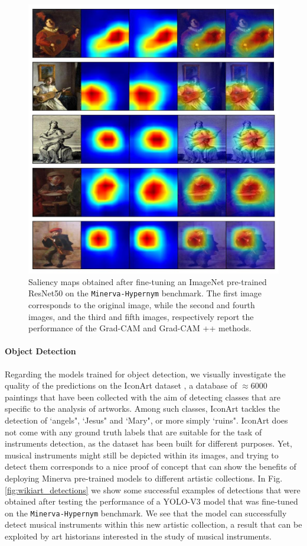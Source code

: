 \begin{figure}[ht!]
\centering
  \includegraphics[width=\linewidth]{./Images/Chapter05/grad_cams}
  \caption{Saliency maps obtained after fine-tuning an ImageNet pre-trained ResNet50 on the \texttt{Minerva-Hypernym} benchmark. The first image corresponds to the original image, while the second and fourth images, and the third and fifth images, respectively report the performance of the Grad-CAM and Grad-CAM ++ methods.}
  \label{fig:grad_cams}
\end{figure}


\paragraph{Object Detection}
Regarding the models trained for object detection, we visually investigate the quality of the predictions on the IconArt dataset \cite{gonthier2018weakly}, a database of $\approx 6000$ paintings that have been collected with the aim of detecting classes that are specific to the analysis of artworks. Among such classes, IconArt tackles the detection of `angels", `Jesus" and `Mary", or more simply `ruins". IconArt does not come with any ground truth labels that are suitable for the task of instruments detection, as the dataset has been built for different purposes. Yet, musical instruments might still be depicted within its images, and trying to detect them corresponds to a nice proof of concept that can show the benefits of deploying Minerva pre-trained models to different artistic collections. In Fig. \ref{fig:wikiart_detections} we show some successful examples of detections that were obtained after testing the performance of a YOLO-V3 model that was fine-tuned on the \texttt{Minerva-Hypernym} benchmark. We see that the model can successfully detect musical instruments within this new artistic collection, a result that can be exploited by art historians interested in the study of musical instruments.   

